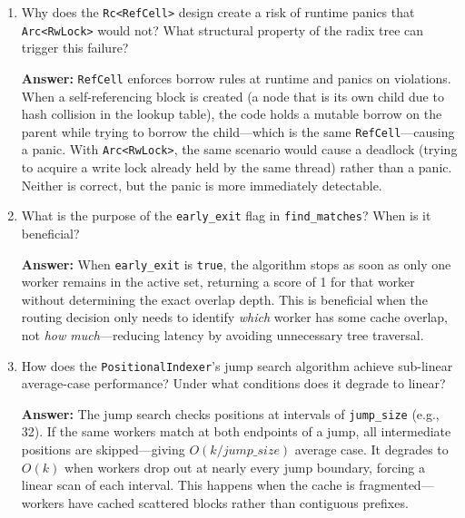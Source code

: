 \begin{enumerate}
  \textbf{Answer:} Pure cache-affinity performs badly when many requests share the same system prompt---all requests would route to the same worker (the one that first cached the prompt), creating a hotspot while other workers sit idle. Pure load balancing performs badly when requests have diverse, long prompts with significant overlap potential---it would distribute requests uniformly, preventing any worker from building up useful cache state, causing every request to pay the full prefill cost.

  \item Why does the \texttt{Rc<RefCell>} design create a risk of runtime panics that \texttt{Arc<RwLock>} would not? What structural property of the radix tree can trigger this failure?

  \textbf{Answer:} \texttt{RefCell} enforces borrow rules at runtime and panics on violations. When a self-referencing block is created (a node that is its own child due to hash collision in the lookup table), the code holds a mutable borrow on the parent while trying to borrow the child---which is the same \texttt{RefCell}---causing a panic. With \texttt{Arc<RwLock>}, the same scenario would cause a deadlock (trying to acquire a write lock already held by the same thread) rather than a panic. Neither is correct, but the panic is more immediately detectable.

  \item What is the purpose of the \texttt{early\_exit} flag in \texttt{find\_matches}? When is it beneficial?

  \textbf{Answer:} When \texttt{early\_exit} is \texttt{true}, the algorithm stops as soon as only one worker remains in the active set, returning a score of 1 for that worker without determining the exact overlap depth. This is beneficial when the routing decision only needs to identify \emph{which} worker has some cache overlap, not \emph{how much}---reducing latency by avoiding unnecessary tree traversal.

  \item How does the \texttt{PositionalIndexer}'s jump search algorithm achieve sub-linear average-case performance? Under what conditions does it degrade to linear?

  \textbf{Answer:} The jump search checks positions at intervals of \texttt{jump\_size} (e.g., 32). If the same workers match at both endpoints of a jump, all intermediate positions are skipped---giving $O(k / \mathit{jump\_size})$ average case. It degrades to $O(k)$ when workers drop out at nearly every jump boundary, forcing a linear scan of each interval. This happens when the cache is fragmented---workers have cached scattered blocks rather than contiguous prefixes.


\end{enumerate}
